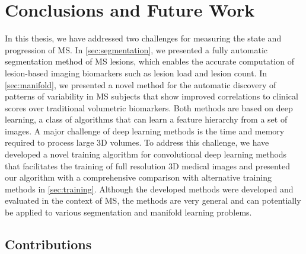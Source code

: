 \chapter{Conclusions and Future Work}
\label{sec:conclusions}

In this thesis, we have addressed two challenges for measuring the state and
progression of MS. In \ref{sec:segmentation}, we presented a fully automatic
segmentation method of MS lesions, which enables the accurate computation of
lesion-based imaging biomarkers such as lesion load and lesion count. In
\ref{sec:manifold}, we presented a novel method for the automatic discovery of
patterns of variability in MS subjects that show improved correlations to
clinical scores over traditional volumetric biomarkers. Both methods are based
on deep learning, a class of algorithms that can learn a feature hierarchy from
a set of images. A major challenge of deep learning methods is the time and
memory required to process large 3D volumes. To address this challenge, we have
developed a novel training algorithm for convolutional deep learning methods
that facilitates the training of full resolution 3D medical images and presented
our algorithm with a comprehensive comparison with alternative training
methods in \ref{sec:training}. Although the developed methods were
developed and evaluated in the context of MS, the methods are very general and
can potentially be applied to various segmentation and manifold learning
problems.

\section{Contributions}

